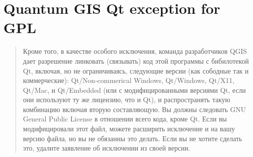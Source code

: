 \section{Quantum GIS Qt exception for GPL}\label{qgis_qt_exception_appendix_ru}

\begin{quotation}
Кроме того, в качестве особого исключения, команда разработчиков QGIS
дает разрешение линковать (связывать) код этой программы с бибилотекой
Qt, включая, но не ограничиваясь, следующие версии (как сободные так и
коммерческие): Qt/Non-commerical Windows, Qt/Windows, Qt/X11, Qt/Mac, и
Qt/Embedded (или с модифицированными версиями Qt, если они используют ту
же лицензию, что и Qt), и распространять такую комбинацию включая вторую
составляющую. Вы должны следовать GNU General Public License в отношении
всего кода, кроме Qt. Если вы модифицировали этот файл, можете расширить
исключение и на вашу версию файла, но вы не обязанны это делать. Если вы
не хотите сделать это, удалите заявление об исключении из своей версии.
\end{quotation}
